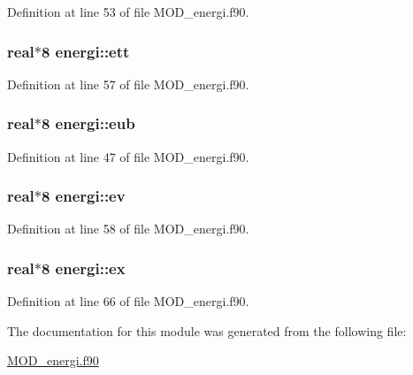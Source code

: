 Definition at line 53 of file M\-O\-D\-\_\-energi.\-f90.

\hypertarget{classenergi_aa4f0c395f8f434e1d69ea3a3e97ae114}{
\subsubsection[{ett}]{\setlength{\rightskip}{0pt plus 5cm}real$\ast$8 energi\-::ett}}\label{classenergi_aa4f0c395f8f434e1d69ea3a3e97ae114}


Definition at line 57 of file M\-O\-D\-\_\-energi.\-f90.

\hypertarget{classenergi_a59f417d8fe59330a0353ef451c767083}{
\subsubsection[{eub}]{\setlength{\rightskip}{0pt plus 5cm}real$\ast$8 energi\-::eub}}\label{classenergi_a59f417d8fe59330a0353ef451c767083}


Definition at line 47 of file M\-O\-D\-\_\-energi.\-f90.

\hypertarget{classenergi_a8e4ba73bb3434084b185cb0190e3f212}{
\subsubsection[{ev}]{\setlength{\rightskip}{0pt plus 5cm}real$\ast$8 energi\-::ev}}\label{classenergi_a8e4ba73bb3434084b185cb0190e3f212}


Definition at line 58 of file M\-O\-D\-\_\-energi.\-f90.

\hypertarget{classenergi_abdfff07b534d7022aeecfc65e0a82894}{
\subsubsection[{ex}]{\setlength{\rightskip}{0pt plus 5cm}real$\ast$8 energi\-::ex}}\label{classenergi_abdfff07b534d7022aeecfc65e0a82894}


Definition at line 66 of file M\-O\-D\-\_\-energi.\-f90.



The documentation for this module was generated from the following file\-:\begin{DoxyCompactItemize}
\item 
\hyperlink{MOD__energi_8f90}{M\-O\-D\-\_\-energi.\-f90}\end{DoxyCompactItemize}
